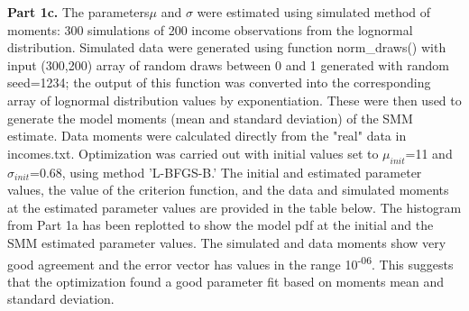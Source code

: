 \documentclass[letterpaper,12pt]{article}
\theoremstyle{definition}
\begin{document}
\noindent\newline\textbf{Part 1c.} The parameters$\mu$ and $\sigma$ were estimated using simulated method of moments: 300 simulations of 200 income observations from the lognormal distribution. Simulated data were generated using function norm\_draws() with input (300,200) array of random draws between 0 and 1 generated with random seed=1234; the output of this function was converted into the corresponding array of lognormal distribution values by exponentiation. These were then used to generate the model moments (mean and standard deviation) of the SMM estimate. Data moments were calculated directly from the "real" data in incomes.txt. Optimization was carried out with initial values set to $\mu_{init}$=11 and $\sigma_{init}$=0.68, using method 'L-BFGS-B.' The initial and estimated parameter values, the value of the criterion function, and the data and simulated moments at the estimated parameter values are provided in the table below. The histogram from Part 1a has been replotted to show the model pdf at the initial and the SMM estimated parameter values. The simulated and data moments show very good agreement and the error vector has values in the range 10\textsuperscript{-06}. This suggests that the optimization found a good parameter fit based on moments mean and standard deviation. 

\begin{center}
\end{center}
\end{document}
